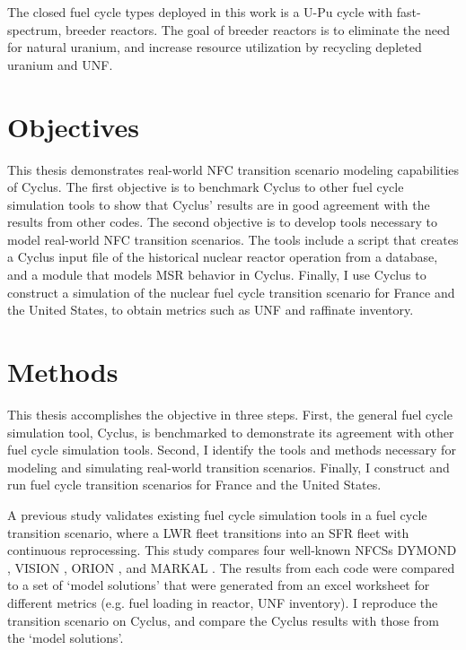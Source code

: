 The closed fuel cycle types deployed in this work is a U-Pu
cycle with fast-spectrum, breeder reactors. The goal of breeder
reactors is to eliminate the need for natural uranium, and
increase resource utilization by recycling depleted uranium and \gls{UNF}.


\section{Objectives}

This thesis demonstrates real-world \gls{NFC} transition
scenario modeling capabilities of Cyclus. The first objective is
to benchmark Cyclus to other fuel cycle simulation tools to
show that Cyclus' results are in good agreement with the results
from other codes. The second objective is to develop tools
necessary to model real-world \gls{NFC} transition
scenarios. The tools include a script that creates a Cyclus
input file of the historical nuclear reactor operation from
a database, and a module that models \gls{MSR} behavior in Cyclus.
Finally, I use Cyclus to construct a simulation of the nuclear
fuel cycle transition scenario for France and the United States,
to obtain metrics such as \gls{UNF} and raffinate inventory.


\section{Methods}
This thesis accomplishes the objective in three steps. First,
the general fuel cycle simulation tool, Cyclus, is benchmarked
to demonstrate its agreement with other fuel cycle simulation
tools. Second, I identify the tools and methods necessary
for modeling and simulating real-world transition scenarios.
Finally, I construct and run fuel cycle transition scenarios
for France and the United States.

A previous study \cite{feng_standardized_2016} validates existing fuel cycle
simulation tools in a fuel cycle transition scenario, where a \gls{LWR} fleet
transitions into an \gls{SFR} fleet with continuous reprocessing. This 
study compares four well-known \glspl{NFCS}
DYMOND \cite{yacout_modeling_2005},
VISION \cite{jacobson_verifiable_2010},
ORION \cite{gregg_analysis_2012}, and
MARKAL \cite{shay_epa_2006}. The results from each code were
compared to a set of `model solutions' that were generated
from an excel worksheet for different metrics (e.g. fuel loading
in reactor, \gls{UNF} inventory). I reproduce the transition
scenario on Cyclus, and compare the Cyclus results with those
from the `model solutions'.

